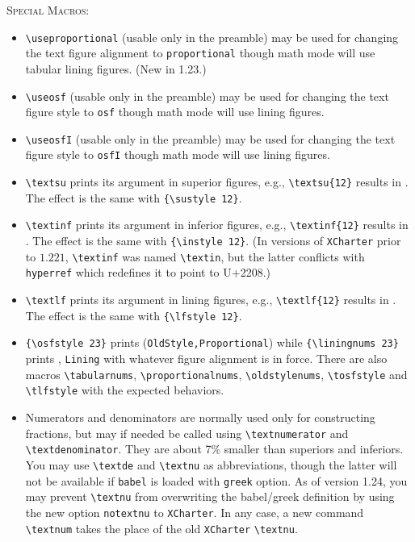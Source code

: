\documentclass[11pt]{article}
\begin{document}
\textsc{Special Macros:}
\begin{itemize}
\item \verb|\useproportional| (usable only in the preamble)  may be used for changing the text figure alignment to {\tt proportional} though math mode will use tabular lining figures. (New in 1.23.)
\item
\verb|\useosf| (usable only in the preamble) may be used for changing the text figure style to {\tt osf} though math mode will use lining figures.
\item \verb|\useosfI| (usable only in the preamble) may be used for changing the text figure style to {\tt osfI} though math mode will use lining figures.
\item \verb|\textsu| prints its argument in superior figures, e.g., \verb|\textsu{12}| results in . The effect is the same with \verb|{\sustyle 12}|.
\item \verb|\textinf| prints its argument in inferior figures, e.g., \verb|\textinf{12}| results in . The effect is the same with \verb|{\instyle 12}|. (In versions of {\tt XCharter} prior to $1.221$, \verb|\textinf| was named \verb|\textin|, but the latter conflicts with {\tt hyperref} which redefines it to point to U+2208.)
\item \verb|\textlf| prints its argument in lining figures, e.g., \verb|\textlf{12}| results in . The effect is the same with \verb|{\lfstyle 12}|.
\item \verb|{\osfstyle 23}| prints  ({\tt OldStyle,Proportional}) while \verb|{\liningnums 23}| prints {}, {\tt Lining} with whatever figure alignment is in force. There are also macros \verb|\tabularnums|, \verb|\proportionalnums|, \verb|\oldstylenums|, \verb|\tosfstyle| and \verb|\tlfstyle| with the expected behaviors.
\item Numerators and denominators are normally used only for constructing fractions, but may if needed be called using \verb|\textnumerator| and \verb|\textdenominator|. They are about 7\% smaller than superiors and inferiors. You may use \verb|\textde| and \verb|\textnu| as abbreviations, though the latter will not be available if {\tt babel} is loaded with {\tt greek} option. As of version 1.24, you may prevent \verb|\textnu| from overwriting the babel/greek definition by using the new option {\tt notextnu} to {\tt XCharter}. In any case, a new command \verb|\textnum| takes the place of the old {\tt XCharter} \verb|\textnu|.

\end{itemize}
\end{document}
